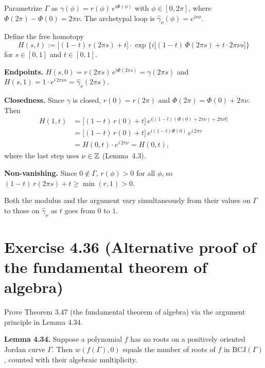\documentclass{article}
\begin{document}
\begin{solution}
  Parametrize $\Gamma$ as $\gamma(\phi) = r(\phi)\,e^{i\Phi(\phi)}$
  with $\phi \in [0, 2\pi]$, where
  $\Phi(2\pi) - \Phi(0) = 2\pi\nu$.
  The archetypal loop is
  $\hat{\gamma}_\nu(\phi) = e^{i\nu\phi}$.

  Define the free homotopy
  \[
    H(s, t)
    := \bigl[(1-t)\,r(2\pi s) + t\bigr]
    \cdot \exp\bigl\{i\bigl[(1-t)\,\Phi(2\pi s)
    + t \cdot 2\pi\nu s\bigr]\bigr\}
  \]
  for $s \in [0, 1]$ and $t \in [0, 1]$.

  \textbf{Endpoints.}\;
  $H(s, 0) = r(2\pi s)\,e^{i\Phi(2\pi s)} = \gamma(2\pi s)$
  and
  $H(s, 1) = 1 \cdot e^{i\,2\pi\nu s}
  = \hat{\gamma}_\nu(2\pi s)$.

  \textbf{Closedness.}\;
  Since $\gamma$ is closed, $r(0) = r(2\pi)$ and
  $\Phi(2\pi) = \Phi(0) + 2\pi\nu$.
  Then
  \begin{align*}
    H(1, t)
    &= \bigl[(1-t)\,r(0) + t\bigr]\,
       e^{i\bigl[(1-t)(\Phi(0)+2\pi\nu)+2\pi\nu t\bigr]} \\
    &= \bigl[(1-t)\,r(0) + t\bigr]\,
       e^{i(1-t)\Phi(0)}\,e^{i\,2\pi\nu} \\
    &= H(0, t) \cdot e^{i\,2\pi\nu}
    = H(0, t),
  \end{align*}
  where the last step uses $\nu \in \mathbb{Z}$ (Lemma~4.3).

  \textbf{Non-vanishing.}\;
  Since $0 \notin \Gamma$, $r(\phi) > 0$ for all $\phi$,
  so $(1-t)\,r(2\pi s) + t \ge \min(r, 1) > 0$.

  Both the modulus and the argument vary simultaneously
  from their values on $\Gamma$ to those on $\hat{\gamma}_\nu$
  as $t$ goes from $0$ to $1$.\qedhere
\end{solution}

\section{Exercise 4.36 (Alternative proof of the fundamental theorem of algebra)}

Prove Theorem 3.47 (the fundamental theorem of algebra) via the argument
principle in Lemma 4.34.

\textbf{Lemma 4.34.}
Suppose a polynomial $f$ has no roots on a positively oriented Jordan
curve $\Gamma$.  Then $w(f(\Gamma), 0)$ equals the number of roots of
$f$ in $\mathrm{BCJ}(\Gamma)$, counted with their algebraic multiplicity.
\end{document}
